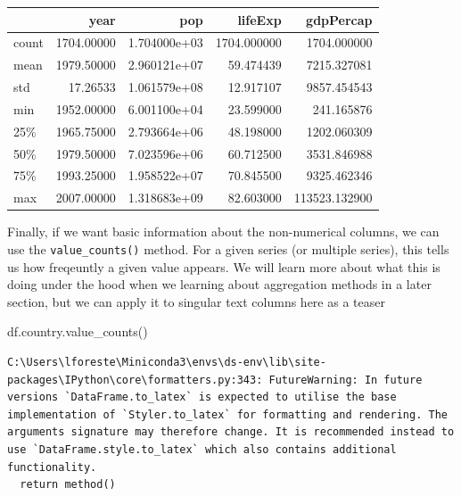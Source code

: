 \documentclass[
  letterpaper,
  DIV=11,
  numbers=noendperiod]{scrreprt}
\newenvironment{Shaded}{\begin{snugshade}}{\end{snugshade}}
\newcommand{\NormalTok}[1]{\textcolor[rgb]{0.00,0.23,0.31}{#1}}
\begin{document}
\begin{tabular}{lrrrr}
\toprule
{} &        year &           pop &      lifeExp &      gdpPercap \\
\midrule
count &  1704.00000 &  1.704000e+03 &  1704.000000 &    1704.000000 \\
mean  &  1979.50000 &  2.960121e+07 &    59.474439 &    7215.327081 \\
std   &    17.26533 &  1.061579e+08 &    12.917107 &    9857.454543 \\
min   &  1952.00000 &  6.001100e+04 &    23.599000 &     241.165876 \\
25\%   &  1965.75000 &  2.793664e+06 &    48.198000 &    1202.060309 \\
50\%   &  1979.50000 &  7.023596e+06 &    60.712500 &    3531.846988 \\
75\%   &  1993.25000 &  1.958522e+07 &    70.845500 &    9325.462346 \\
max   &  2007.00000 &  1.318683e+09 &    82.603000 &  113523.132900 \\
\bottomrule
\end{tabular}

Finally, if we want basic information about the non-numerical columns,
we can use the \texttt{value\_counts()} method. For a given series (or
multiple series), this tells us how freqeuntly a given value appears. We
will learn more about what this is doing under the hood when we learning
about aggregation methods in a later section, but we can apply it to
singular text columns here as a teaser

\begin{Shaded}
\begin{Highlighting}[]
\NormalTok{df.country.value\_counts()}
\end{Highlighting}
\end{Shaded}

\begin{verbatim}
C:\Users\lforeste\Miniconda3\envs\ds-env\lib\site-packages\IPython\core\formatters.py:343: FutureWarning: In future versions `DataFrame.to_latex` is expected to utilise the base implementation of `Styler.to_latex` for formatting and rendering. The arguments signature may therefore change. It is recommended instead to use `DataFrame.style.to_latex` which also contains additional functionality.
  return method()
\end{verbatim}
\end{document}
